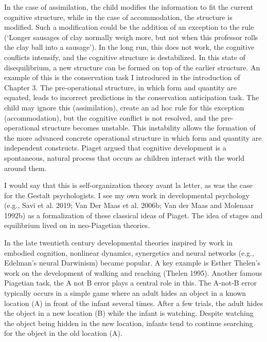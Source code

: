 \documentclass[
  a4paper,
  DIV=11,
  numbers=noendperiod,
  oneside]{scrreprt}
\begin{document}
In the case of assimilation, the child modifies the information to fit
the current cognitive structure, while in the case of accommodation, the
structure is modified. Such a modification could be the addition of an
exception to the rule (`Longer sausages of clay normally weigh more, but
not when this professor rolls the clay ball into a sausage'). In the
long run, this does not work, the cognitive conflicts intensify, and the
cognitive structure is destabilized. In this state of disequilibrium, a
new structure can be formed on top of the earlier structure. An example
of this is the conservation task I introduced in the introduction of
Chapter 3. The pre-operational structure, in which form and quantity are
equated, leads to incorrect predictions in the conservation anticipation
task. The child may ignore this (assimilation), create an ad hoc rule
for this exception (accommodation), but the cognitive conflict is not
resolved, and the pre-operational structure becomes unstable. This
instability allows the formation of the more advanced concrete
operational structure in which form and quantity are independent
constructs. Piaget argued that cognitive development is a spontaneous,
natural process that occurs as children interact with the world around
them.

I would say that this is self-organization theory avant la letter, as
was the case for the Gestalt psychologists. I see my own work in
developmental psychology (e.g., Savi et al. 2019; Van Der Maas et al.
2006b; Van der Maas and Molenaar 1992b) as a formalization of these
classical ideas of Piaget. The idea of stages and equilibrium lived on
in neo-Piagetian theories.

In the late twentieth century developmental theories inspired by work in
embodied cognition, nonlinear dynamics, synergetics and neural networks
(e.g., Edelman's neural Darwinism) became popular. A key example is
Esther Thelen's work on the development of walking and reaching (Thelen
1995). Another famous Piagetian task, the A not B error plays a central
role in this. The A-not-B error typically occurs in a simple game where
an adult hides an object in a known location (A) in front of the infant
several times. After a few trials, the adult hides the object in a new
location (B) while the infant is watching. Despite watching the object
being hidden in the new location, infants tend to continue searching for
the object in the old location (A).
\end{document}
